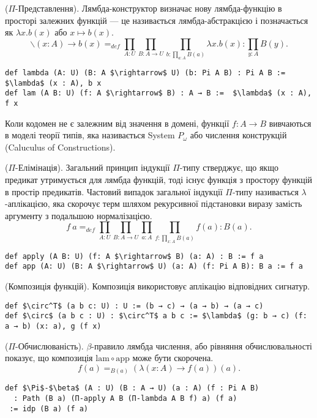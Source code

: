 \begin{definition} ($\Pi$-Представлення). Лямбда-конструктор визначає
нову лямбда-функцію в просторі залежних функцій — це називається
лямбда-абстракцією і позначається як $\lambda x. b(x)$ або $x \mapsto b(x)$.
$$\backslash (x: A) \rightarrow b(x) =_{def} \prod_{A:U}\prod_{B:A \rightarrow U}\prod_{b:\prod_{a:A}B(a)}\lambda x.b(x) : \prod_{y:A}B(y).$$
\begin{lstlisting}
def lambda (A: U) (B: A $\rightarrow$ U) (b: Pi A B) : Pi A B := $\lambda$ (x : A), b x
def lam (A B: U) (f: A $\rightarrow$ B) : A → B :=  $\lambda$ (x : A), f x
\end{lstlisting}
\end{definition}
Коли кодомен не є залежним від значення в домені, функції $f: A \rightarrow B$ вивчаються в моделі теорії типів,
яка називається System $P_\omega$ або числення конструкцій (Caluculus of Constructions).

\newpage
\begin{definition} ($\Pi$-Елімінація). Загальний принцип індукції $\Pi$-типу стверджує, що якщо предикат утримується
для лямбда функцій, тоді існує функція з простору функцій в простір предикатів. Частовий випадок загальної індукції
$\Pi$-типу називається $\lambda$-аплікацією, яка скорочує терм шляхом рекурсивної підстановки виразу замість аргументу з
подальшою нормалізацією.
$$f\ a =_{def} \prod_{A:U}\prod_{B: A \rightarrow U}\prod_{a:A}\prod_{f: \prod_{x:A}B(a)}f(a) : B(a).$$
\begin{lstlisting}
def apply (A B: U) (f: A $\rightarrow$ B) (a: A) : B := f a
def app (A: U) (B: A $\rightarrow$ U) (a: A) (f: Pi A B): B a := f a
\end{lstlisting}
\end{definition}

\begin{definition} (Композиція функцій). Композиція використовує аплікацію відповідних сигнатур.
\begin{lstlisting}
def $\circ^T$ (a b c: U) : U := (b → c) → (a → b) → (a → c)
def $\circ$ (a b c : U) : $\circ^T$ a b c := $\lambda$ (g: b → c) (f: a → b) (x: a), g (f x)
\end{lstlisting}
\end{definition}

\begin{theorem} ($\Pi$-Обчислюваність). $\beta$-правило лямбда числення, або рівняння
обчислювальності показує, що композиція $\mathrm{lam} \circ \mathrm{app}$ може бути скорочена.
$$f(a) =_{B(a)} (\lambda (x:A) \rightarrow f(a))(a).$$
\begin{lstlisting}
def $\Pi$-$\beta$ (A : U) (B : A → U) (a : A) (f : Pi A B)
  : Path (B a) (Π-apply A B (Π-lambda A B f) a) (f a)
 := idp (B a) (f a)
\end{lstlisting}
\end{theorem}

